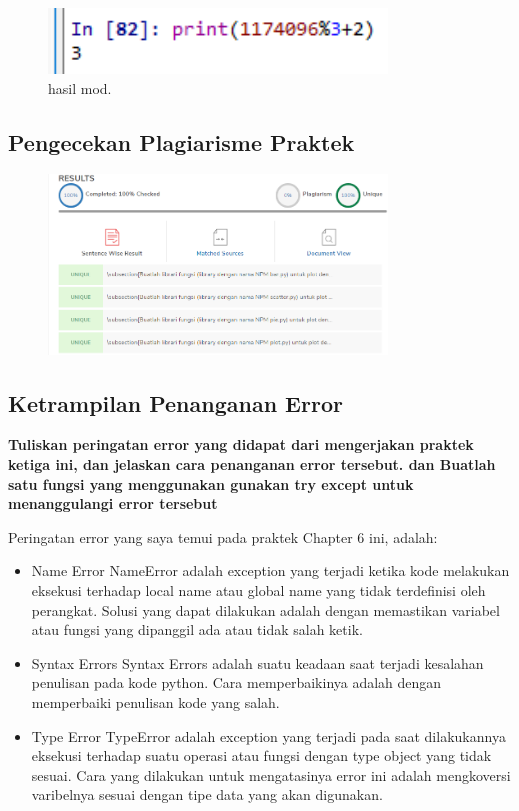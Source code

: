 \begin{figure}[H]
	\includegraphics[width=9cm]{figures/6/Praktek/1174056/hasilmod.png}
	\caption{hasil mod.}
	\centering
\end{figure}

\subsection{Pengecekan Plagiarisme Praktek}
\begin{figure}[H]
	\includegraphics[width=9cm]{figures/6/Praktek/1174056/Plagiatpraktek.png}
	\centering
\end{figure}

\subsection{Ketrampilan Penanganan Error}
\textbf{Tuliskan peringatan error yang didapat dari mengerjakan praktek ketiga ini, dan jelaskan cara penanganan error tersebut. dan Buatlah satu fungsi yang menggunakan gunakan try except untuk menanggulangi error tersebut}

Peringatan error yang saya temui pada praktek Chapter 6 ini, adalah:
\begin{itemize}
	\item Name Error
	NameError adalah exception yang terjadi ketika kode melakukan eksekusi terhadap local name atau global name yang tidak terdefinisi oleh perangkat. Solusi yang dapat dilakukan adalah dengan memastikan variabel atau fungsi yang dipanggil ada atau tidak salah ketik.
	
	\item Syntax Errors
	Syntax Errors adalah suatu keadaan saat  terjadi kesalahan penulisan pada kode python. Cara memperbaikinya adalah dengan memperbaiki penulisan kode yang salah.
	
	\item Type Error
	TypeError adalah exception yang terjadi pada saat dilakukannya eksekusi terhadap suatu operasi atau fungsi dengan type object yang tidak sesuai. Cara yang dilakukan untuk mengatasinya error ini adalah mengkoversi varibelnya sesuai dengan tipe data yang akan digunakan.
\end{itemize}

